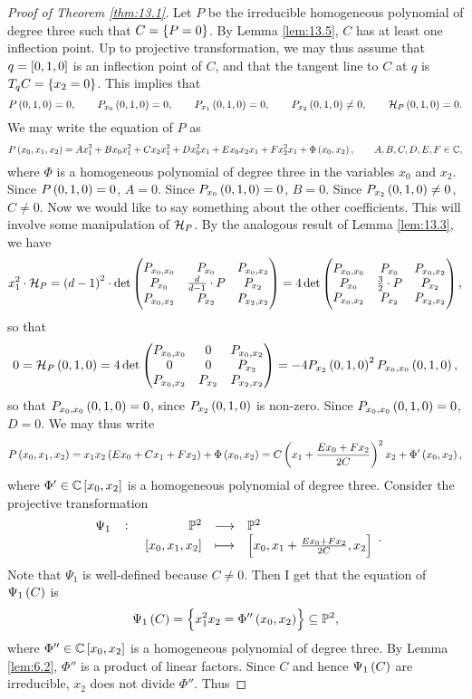 \begin{proof}[Proof of Theorem \ref{thm:13.1}]
Let $ P $ be the irreducible homogeneous polynomial of degree three such that $ C = \cbr{P = 0} $. By Lemma \ref{lem:13.5}, $ C $ has at least one inflection point. Up to projective transformation, we may thus assume that $ q = \sbr{0, 1, 0} $ is an inflection point of $ C $, and that the tangent line to $ C $ at $ q $ is $ T_qC = \cbr{x_2 = 0} $. This implies that
$$ P\br{0, 1, 0} = 0, \qquad P_{x_0}\br{0, 1, 0} = 0, \qquad P_{x_1}\br{0, 1, 0} = 0, \qquad P_{x_2}\br{0, 1, 0} \ne 0, \qquad \HH_P\br{0, 1, 0} = 0. $$
We may write the equation of $ P $ as
$$ P\br{x_0, x_1, x_2} = Ax_1^3 + Bx_0x_1^2 + Cx_2x_1^2 + Dx_0^2x_1 + Ex_0x_2x_1 + Fx_2^2x_1 + \Phi\br{x_0, x_2}, \qquad A, B, C, D, E, F \in \C, $$
where $ \Phi $ is a homogeneous polynomial of degree three in the variables $ x_0 $ and $ x_2 $. Since $ P\br{0, 1, 0} = 0 $, $ A = 0 $. Since $ P_{x_0}\br{0, 1, 0} = 0 $, $ B = 0 $. Since $ P_{x_2}\br{0, 1, 0} \ne 0 $, $ C \ne 0 $. Now we would like to say something about the other coefficients. This will involve some manipulation of $ \mathcal{H}_P $. By the analogous result of Lemma \ref{lem:13.3}, we have
$$ x_1^2 \cdot \HH_P = \br{d - 1}^2 \cdot \det\threebythree{P_{x_0, x_0}}{P_{x_0}}{P_{x_0, x_2}}{P_{x_0}}{\tfrac{d}{d - 1} \cdot P}{P_{x_2}}{P_{x_0, x_2}}{P_{x_2}}{P_{x_2, x_2}} = 4\det\threebythree{P_{x_0, x_0}}{P_{x_0}}{P_{x_0, x_2}}{P_{x_0}}{\tfrac{3}{2} \cdot P}{P_{x_2}}{P_{x_0, x_2}}{P_{x_2}}{P_{x_2, x_2}}, $$
so that
$$ 0 = \HH_P\br{0, 1, 0} = 4\det\threebythree{P_{x_0, x_0}}{0}{P_{x_0, x_2}}{0}{0}{P_{x_2}}{P_{x_0, x_2}}{P_{x_2}}{P_{x_2, x_2}} = -4P_{x_2}\br{0, 1, 0}^2P_{x_0, x_0}\br{0, 1, 0}, $$
so that $ P_{x_0, x_0}\br{0, 1, 0} = 0 $, since $ P_{x_2}\br{0, 1, 0} $ is non-zero. Since $ P_{x_0, x_0}\br{0, 1, 0} = 0 $, $ D = 0 $. We may thus write
$$ P\br{x_0, x_1, x_2} = x_1x_2\br{Ex_0 + Cx_1 + Fx_2} + \Phi\br{x_0, x_2} = C\br{x_1 + \dfrac{Ex_0 + Fx_2}{2C}}^2x_2 + \Phi'\br{x_0, x_2}, $$
where $ \Phi' \in \C\sbr{x_0, x_2} $ is a homogeneous polynomial of degree three. Consider the projective transformation
$$ \function[\Psi_1]{\P^2}{\P^2}{\sbr{x_0, x_1, x_2}}{\sbr{x_0, x_1 + \tfrac{Ex_0 + Fx_2}{2C}, x_2}}. $$
Note that $ \Psi_1 $ is well-defined because $ C \ne 0 $. Then I get that the equation of $ \Psi_1\br{C} $ is
$$ \Psi_1\br{C} = \cbr{x_1^2x_2 = \Phi''\br{x_0, x_2}} \subseteq \P^2, $$
where $ \Phi'' \in \C\sbr{x_0, x_2} $ is a homogeneous polynomial of degree three. By Lemma \ref{lem:6.2}, $ \Phi'' $ is a product of linear factors. Since $ C $ and hence $ \Psi_1\br{C} $ are irreducible, $ x_2 $ does not divide $ \Phi'' $. Thus

\end{proof}
